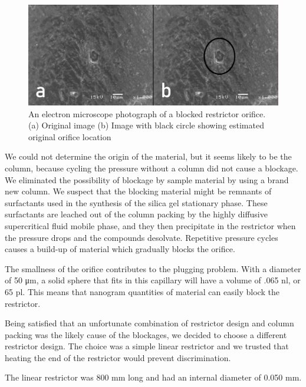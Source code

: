 \begin{figure}
\centering
\includegraphics[width=\textwidth]{Figures/Blockage_1920.png}
\decoRule

\caption[A electron microscope photo of a blocked restrictor orifice]{An
electron microscope photograph of a blocked restrictor orifice. (a) Original
image (b) Image with black circle showing estimated original orifice location}

\label{fig:restrictorblockage}
\end{figure}

We could not determine the origin of the material, but it seems likely to be the
column, because cycling the pressure without a column did not cause a blockage.
We eliminated the possibility of blockage by sample material by using a brand
new column. We suspect that the blocking material might be remnants of
surfactants used in the synthesis of the silica gel stationary phase. These
surfactants are leached out of the column packing by the highly diffusive
supercritical fluid mobile phase, and they then precipitate in the restrictor
when the pressure drops and the compounds desolvate. Repetitive pressure cycles
causes a build-up of material which gradually blocks the orifice.

The smallness of the orifice contributes to the plugging problem. With a
diameter of 50 \si{\micro\metre}, a solid sphere that fits in this capillary
will have a volume of .065 \si{\nano\litre}, or 65 \si{\pico\litre}. This means
that nanogram quantities of material can easily block the restrictor.

Being satisfied that an unfortunate combination of restrictor design and column
packing was the likely cause of the blockages, we decided to choose a
different restrictor design. The choice was a simple linear restrictor and
we trusted that heating the end of the restrictor would prevent discrimination.

The linear restrictor was 800 \si{\milli\metre} long and had an internal
diameter of 0.050 \si{\milli\metre}.


